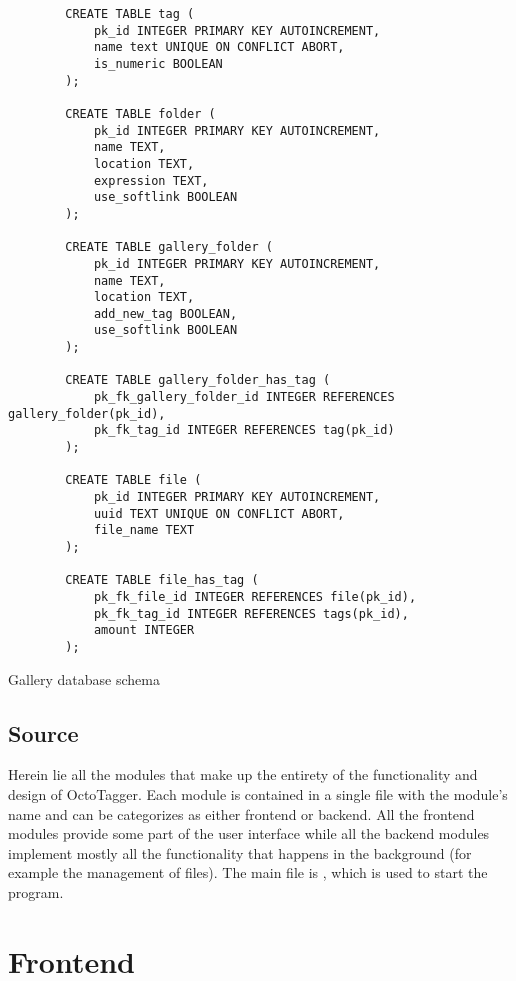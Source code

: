 \begin{listing}[!ht]
	\begin{verbatim}
		CREATE TABLE tag (
			pk_id INTEGER PRIMARY KEY AUTOINCREMENT,
			name text UNIQUE ON CONFLICT ABORT,
			is_numeric BOOLEAN
		);

		CREATE TABLE folder (
			pk_id INTEGER PRIMARY KEY AUTOINCREMENT,
			name TEXT,
			location TEXT,
			expression TEXT,
			use_softlink BOOLEAN
		);

		CREATE TABLE gallery_folder (
			pk_id INTEGER PRIMARY KEY AUTOINCREMENT,
			name TEXT,
			location TEXT,
			add_new_tag BOOLEAN,
			use_softlink BOOLEAN
		);

		CREATE TABLE gallery_folder_has_tag (
			pk_fk_gallery_folder_id INTEGER REFERENCES gallery_folder(pk_id),
			pk_fk_tag_id INTEGER REFERENCES tag(pk_id)
		);

		CREATE TABLE file (
			pk_id INTEGER PRIMARY KEY AUTOINCREMENT,
			uuid TEXT UNIQUE ON CONFLICT ABORT,
			file_name TEXT
		);

		CREATE TABLE file_has_tag (
			pk_fk_file_id INTEGER REFERENCES file(pk_id),
			pk_fk_tag_id INTEGER REFERENCES tags(pk_id),
			amount INTEGER
		);
	\end{verbatim}
	\caption{Gallery database schema}
	\label{lst:db:gallery}
\end{listing}
\FloatBarrier

\subsection{Source}
Herein lie all the modules that make up the entirety of the functionality and
design of OctoTagger. Each module is contained in a single file with the
module's name and can be categorizes as either frontend or backend. All the
frontend modules provide some part of the user interface while all the backend
modules implement mostly all the functionality that happens in the background
(for example the management of files). The main file is ,
which is used to start the program.



\section{Frontend}













